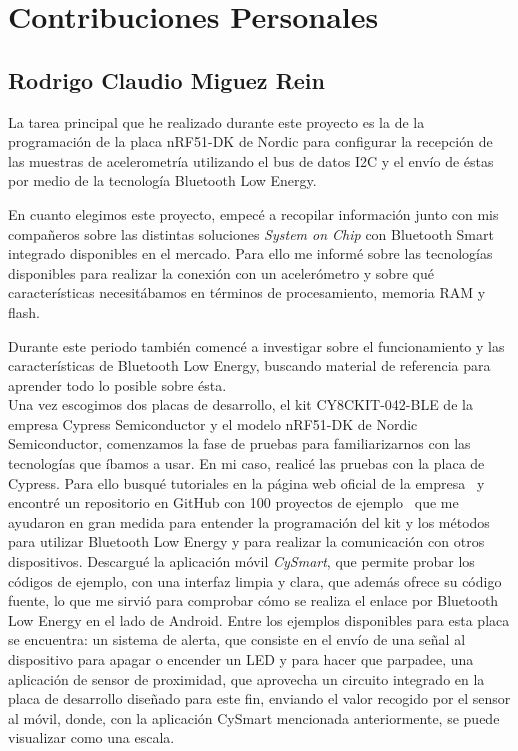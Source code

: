 \newpage %

\section{Contribuciones Personales}
\label{makereference1.4}

\subsection{Rodrigo Claudio Miguez Rein}

La tarea principal que he realizado durante este proyecto es la de la programación de la placa nRF51-DK de Nordic para configurar la recepción de las muestras de acelerometría utilizando el bus de datos I2C y el envío de éstas por medio de la tecnología Bluetooth Low Energy.

En cuanto elegimos este proyecto, empecé a recopilar información junto con mis compañeros sobre las distintas soluciones \textit{System on Chip} con Bluetooth Smart integrado disponibles en el mercado. Para ello me informé sobre las tecnologías disponibles para realizar la conexión con un acelerómetro y sobre qué características necesitábamos en términos de procesamiento, memoria RAM y flash.

Durante este periodo también comencé a investigar sobre el funcionamiento y las características de Bluetooth Low Energy, buscando material de referencia para aprender todo lo posible sobre ésta.\\

Una vez escogimos dos placas de desarrollo, el kit CY8CKIT-042-BLE de la empresa Cypress Semiconductor y el modelo nRF51-DK de Nordic Semiconductor, comenzamos la fase de pruebas para familiarizarnos con las tecnologías que íbamos a usar. En mi caso, realicé las pruebas con la placa de Cypress. Para ello busqué tutoriales en la página web oficial de la empresa~\cite{CypressTutorials} y encontré un repositorio en GitHub con 100 proyectos de ejemplo~\cite{100Projects} que me ayudaron en gran medida para entender la programación del kit y los métodos para utilizar Bluetooth Low Energy y para realizar la comunicación con otros dispositivos. Descargué la aplicación móvil \textit{CySmart}, que permite probar los códigos de ejemplo, con una interfaz limpia y clara, que además ofrece su código fuente, lo que me sirvió para comprobar cómo se realiza el enlace por Bluetooth Low Energy en el lado de Android.
Entre los ejemplos disponibles para esta placa se encuentra: un sistema de alerta, que consiste en el envío de una señal al dispositivo para apagar o encender un LED y para hacer que parpadee, una aplicación de sensor de proximidad, que aprovecha un circuito integrado en la placa de desarrollo diseñado para este fin, enviando el valor recogido por el sensor al móvil, donde, con la aplicación CySmart mencionada anteriormente, se puede visualizar como una escala.

